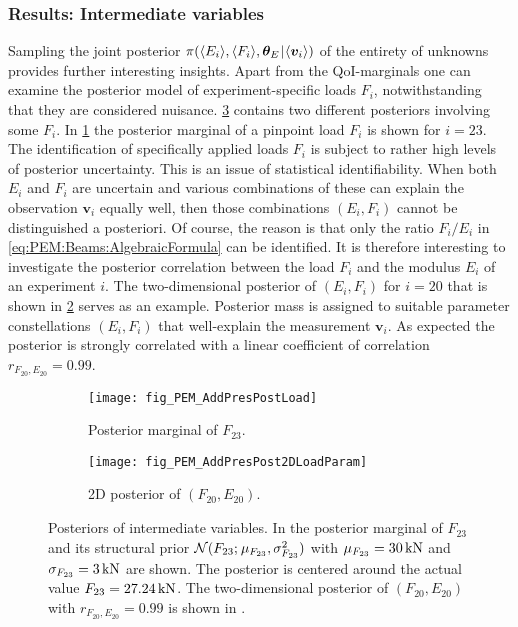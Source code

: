 \subsubsection{Results: Intermediate variables}
\par %
Sampling the joint posterior \(\pi(\langle{E_i}\rangle,\langle{F_i}\rangle,\bm{\theta}_E {\:\!}|{\:\!} \langle{\bm{v}_i}\rangle)\) of the entirety of unknowns provides further interesting insights.
Apart from the QoI-marginals one can examine the posterior model of experiment-specific loads \(F_i\), notwithstanding that they are considered nuisance.
\cref{fig:PEM:AddPres:Posteriors} contains two different posteriors involving some \(F_i\).
In \cref{fig:PEM:AddPres:Post:1DLoad} the posterior marginal of a pinpoint load \(F_i\) is shown for \(i=23\).
The identification of specifically applied loads \(F_i\) is subject to rather high levels of posterior uncertainty.
This is an issue of statistical identifiability.
When both \(E_i\) and \(F_i\) are uncertain and various combinations of these can explain the observation \(\bm{v}_i\) equally well, then those combinations \((E_i,F_i)\) cannot be distinguished a posteriori.
Of course, the reason is that only the ratio \(F_i/E_i\) in \cref{eq:PEM:Beams:AlgebraicFormula} can be identified.
It is therefore interesting to investigate the posterior correlation between the load \(F_i\) and the modulus \(E_i\) of an experiment \(i\).
The two-dimensional posterior of \((E_i,F_i)\) for \(i=20\) that is shown in \cref{fig:PEM:AddPres:Post:2DMeanLoad} serves as an example.
Posterior mass is assigned to suitable parameter constellations \((E_i,F_i)\) that well-explain the measurement \(\bm{v}_i\).
As expected the posterior is strongly correlated with a linear coefficient of correlation \(r_{F_{20},E_{20}} = 0.99\).
\begin{figure}[ht]
  \centering
  \begin{subfigure}[b]{0.5\textwidth}
    \centering
    \texttt{[image: fig\_PEM\_AddPresPostLoad]}
    \caption{Posterior marginal of \(F_{23}\).}
    \label{fig:PEM:AddPres:Post:1DLoad}
  \end{subfigure}%
  \begin{subfigure}[b]{0.5\textwidth}
    \centering
    \texttt{[image: fig\_PEM\_AddPresPost2DLoadParam]}
    \caption{2D posterior of \((F_{20},E_{20})\).}
    \label{fig:PEM:AddPres:Post:2DMeanLoad}
  \end{subfigure}%
  \caption[Posteriors of intermediate variables]{Posteriors of intermediate variables.
           In  the posterior marginal of \(F_{23}\) and its structural prior
           \(\mathcal{N}(F_{23} ;{\:\!} \mu_{F_{23}},\sigma_{F_{23}}^2)\) with \(\mu_{F_{23}}=\unit[30]{kN}\) and \(\sigma_{F_{23}}=\unit[3]{kN}\) are shown.
           The posterior is centered around the actual value \(F_{23} = \unit[27.24]{kN}\).
           The two-dimensional posterior of \((F_{20},E_{20})\) with \(r_{F_{20},E_{20}} = 0.99\) is shown in .
          }
  \label{fig:PEM:AddPres:Posteriors}
\end{figure}